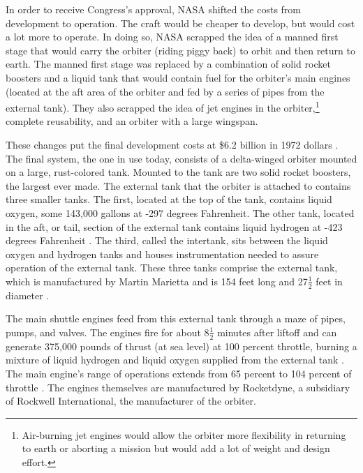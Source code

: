 In order to receive Congress's approval, NASA shifted the
costs from development to operation.
The craft would be cheaper to develop, but would cost a lot
more to operate.
In doing so, NASA scrapped the idea of a manned first stage
that would carry the orbiter (riding piggy back) to orbit
and then return to earth.
The manned first stage was replaced by a combination of
solid rocket boosters and a liquid tank that would contain
fuel for the orbiter's main engines (located at the aft area
of the orbiter and fed by a series of pipes from the
external tank).
They also scrapped the idea of jet engines in the
orbiter,\footnote{Air-burning jet engines would allow the
orbiter more flexibility in returning to earth or aborting a
mission but would add a lot of weight and design effort.}
complete reusability, and an orbiter with a large wingspan.

These changes put the final development costs at \$6.2
billion in 1972 dollars \cite[vol. 1, p. 4]{rogers}.
The final system, the one in use today, consists of a
delta-winged orbiter mounted on a large, rust-colored tank.
Mounted to the tank are two solid rocket boosters, the
largest ever made.
The external tank that the orbiter is attached to contains
three smaller tanks.
The first, located at the top of the tank, contains liquid
oxygen, some 143,000 gallons at -297 degrees Fahrenheit.
The other tank, located in the aft, or tail, section of the
external tank contains liquid hydrogen at -423 degrees
Fahrenheit \cite[vol. 1, p. 8]{rogers}.
The third, called the intertank, sits
between the liquid oxygen and hydrogen tanks and houses
instrumentation needed to assure operation of the external
tank.
These three tanks comprise the external tank, which is
manufactured by Martin Marietta and is 154 feet long and
27$\frac{1}{2}$ feet in diameter \cite[vol. 1, p.
8]{rogers}.

The main shuttle engines feed from this external tank
through a maze of pipes, pumps, and valves.  The engines
fire for about 8$\frac{1}{2}$ minutes after liftoff and can
generate
375,000 pounds of thrust (at sea level) at 100 percent
throttle, burning a mixture of liquid hydrogen and liquid
oxygen supplied from the external tank \cite[vol. 1, p.
7]{rogers}.
The main engine's range of operations extends from 65
percent to 104 percent of throttle \cite[vol. 1, p. 8]{rogers}.
The engines themselves
are manufactured by Rocketdyne, a subsidiary of Rockwell
International, the manufacturer of the orbiter.

